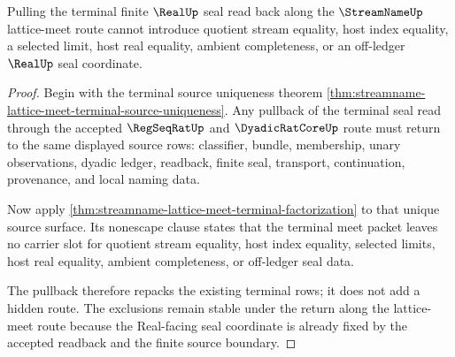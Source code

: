 \begin{theorem}
\label{thm:streamname-lattice-meet-terminal-pullback-nonescape}
Pulling the terminal finite $\RealUp$ seal read back along the $\StreamNameUp$ lattice-meet route cannot introduce quotient stream equality, host index equality, a selected limit, host real equality, ambient completeness, or an off-ledger $\RealUp$ seal coordinate.
\end{theorem}
\begin{proof}
Begin with the terminal source uniqueness theorem \autoref{thm:streamname-lattice-meet-terminal-source-uniqueness}. Any pullback of the terminal seal read through the accepted $\RegSeqRatUp$ and $\DyadicRatCoreUp$ route must return to the same displayed source rows: classifier, bundle, membership, unary observations, dyadic ledger, readback, finite seal, transport, continuation, provenance, and local naming data.

Now apply \autoref{thm:streamname-lattice-meet-terminal-factorization} to that unique source surface. Its nonescape clause states that the terminal meet packet leaves no carrier slot for quotient stream equality, host index equality, selected limits, host real equality, ambient completeness, or off-ledger seal data.

The pullback therefore repacks the existing terminal rows; it does not add a hidden route. The exclusions remain stable under the return along the lattice-meet route because the Real-facing seal coordinate is already fixed by the accepted readback and the finite source boundary.
\end{proof}

